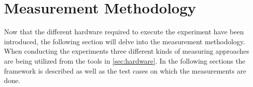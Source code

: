 \section{Measurement Methodology}\label{sec:Measurement_Methodology}

Now that the different hardware required to execute the experiment have been introduced, the following section will delve into the measurement methodology. When conducting the experiments three different kinds of measuring approaches are being utilized from the tools in \cref{sec:hardware}. In the following sections the framework is described as well as the test cases on which the measurements are done.





%


